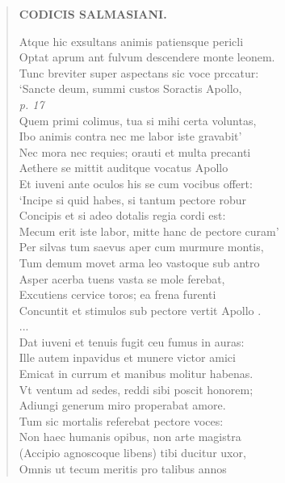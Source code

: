 \documentclass[11pt, a4paper]{report}
\begin{document}
\begin{verse}
    \begin{center} \textbf{CODICIS SALMASIANI.} \end{center} \marginpar{[51]} Atque hic exsultans animis patiensque pericli \\ Optat aprum ant fulvum descendere monte leonem. \\ Tunc breviter super aspectans sic voce prccatur: \\ ‘Sancte deum, summi custos Soractis Apollo, \\ \textit{p. 17} \\ Quem primi colimus, tua si mihi certa voluntas, \\ Ibo animis contra nec me labor iste gravabit’ \\ Nec mora nec requies; orauti et multa precanti \\ Aethere se mittit auditque vocatus Apollo \\ Et iuveni ante oculos his se cum vocibus offert: \\ ‘Incipe si quid habes, si tantum pectore robur \\ Concipis et si adeo dotalis regia cordi est: \\ Mecum erit iste labor, mitte hanc de pectore curam’ \\ Per silvas tum saevus aper cum murmure montis, \\ Tum demum movet arma leo vastoque sub antro \\ Asper acerba tuens vasta se mole ferebat, \\ Excutiens cervice toros; ea frena furenti \\ Concuntit et stimulos sub pectore vertit Apollo . \\ 
                     \lbrack ... \rbrack 
                 \\ Dat iuveni et tenuis  \lbrack fugit \rbrack  ceu fumus in auras: \\ Ille autem inpavidus et munere victor amici \\ Emicat in currum et manibus molitur habenas. \\ Vt ventum ad sedes, reddi sibi poscit honorem; \\ Adiungi generum miro properabat amore. \\ Tum sic mortalis referebat pectore voces: \\ Non haec humanis opibus, non arte magistra \\ (Accipio agnoscoque libens) tibi ducitur uxor, \\ Omnis ut tecum meritis pro talibus annos \\ 

\end{verse}
\end{document}
